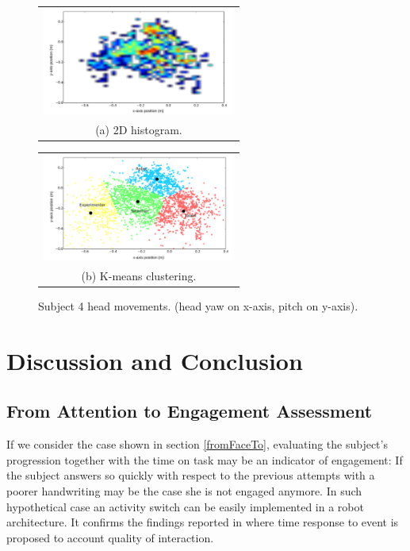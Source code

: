 \documentclass{sig-alternate}
\begin{document}
\begin{figure}
  \centering
  \begin{tabular}{@{}c@{}}
    \includegraphics[width=.7\linewidth,height=100pt]{heatmap} \\
    \small (a)  2D histogram.
  \end{tabular}

  \vspace{\floatsep}

  \begin{tabular}{@{}c@{}}
    \includegraphics[width=.7\linewidth,height=100pt]{kmeans} \\
    \small (b) K-means clustering.
  \end{tabular}

  \caption{ \small Subject 4 head movements. (head yaw on x-axis, pitch on y-axis).}
  \label{fig:heatmap}
\end{figure}

\section{Discussion and Conclusion}
\subsection{From Attention to Engagement Assessment}

If we consider the case shown in section \ref{fromFaceTo}, evaluating the
subject's progression together with the time on task may be an indicator of
engagement: If the subject answers so quickly with respect to the previous
attempts with a poorer handwriting may be the case she is not engaged anymore.
In such hypothetical case an activity switch can be easily implemented in a
robot architecture. It confirms the findings reported in \cite{anzalone} where
time response to event is proposed to account quality of interaction. 
\end{document}
